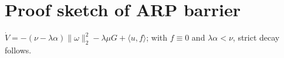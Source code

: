 \section{Proof sketch of ARP barrier}
$\dot V = -(\nu-\lambda\alpha)\|\omega\|_2^2 - \lambda\mu G + \langle u,f\rangle$; with $f\equiv0$ and $\lambda\alpha<\nu$, strict decay follows.
